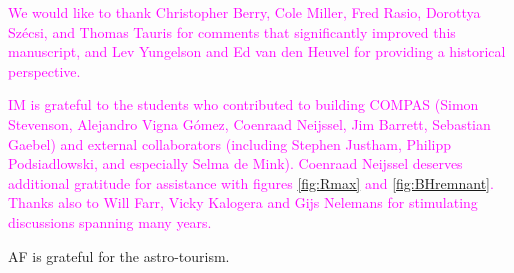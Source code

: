 \documentclass[iop,onecolumn]{revtex4}
\newcommand{\ilya}[1]{\textcolor{magenta}{#1}}
\begin{document}
\begin{acknowledgements}
\ilya{We would like to thank Christopher Berry, Cole Miller, Fred Rasio, Dorottya Sz\'{e}csi, and Thomas Tauris for comments that significantly improved this manuscript, and Lev Yungelson and Ed van den Heuvel for providing a historical perspective.}

\ilya{IM is grateful to the students who contributed to building COMPAS (Simon Stevenson, Alejandro Vigna G\'{o}mez, Coenraad Neijssel, Jim Barrett, Sebastian Gaebel) and external collaborators (including Stephen Justham, Philipp Podsiadlowski, and especially Selma de Mink).  Coenraad Neijssel deserves additional gratitude for assistance with figures \ref{fig:Rmax} and \ref{fig:BHremnant}. Thanks also to  Will Farr, Vicky Kalogera and Gijs Nelemans for stimulating discussions spanning many years.}

AF is grateful for the astro-tourism.
\end{acknowledgements}



\end{document}
